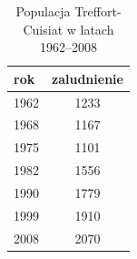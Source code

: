 \documentclass[a4paper,12pt]{article}
\begin{document}
\begin{table}
\centering
\begin{tabular}{lc}
\textbf{rok} & \textbf{zaludnienie}\\
\hline
1962 & 1233\\
1968 & 1167\\
1975 & 1101\\
1982 & 1556\\
1990 & 1779\\
1999 & 1910\\
2008 & 2070\\
\hline
\end{tabular}

\caption{Populacja Treffort-Cuisiat w latach 1962–2008}
\end{table}
\end{document}
